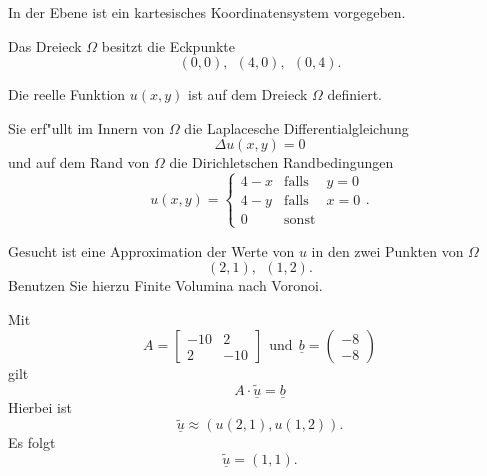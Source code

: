 In der Ebene ist ein kartesisches Koordinatensystem vorgegeben. 

\vspace{2mm}

Das Dreieck $\Omega$ besitzt die Eckpunkte
\[
(0,0), \ \ (4,0), \ \ (0,4).
\]

Die reelle Funktion $u(x,y)$ ist auf dem Dreieck $\Omega$ definiert. 

\vspace{2mm}

Sie erf"ullt im Innern von $\Omega$ die Laplacesche Differentialgleichung 
\[
\Delta u(x,y) = 0
\]
und auf dem Rand von $\Omega$ die Dirichletschen Randbedingungen 
\[
u(x,y) = \left\{ \begin{array}{ccc} 4 - x & \mbox{falls} & y = 0
\\ 4 - y & \mbox{falls} & x = 0  \\ 0  & \mbox{sonst} & \end{array} \right.       .
\]

Gesucht ist eine Approximation der Werte von $u$ in den zwei Punkten
von $\Omega$ 
\[
(2,1), \ \ (1,2).
\]
Benutzen Sie hierzu Finite Volumina nach Voronoi.

\begin{loesung}
Mit
\[
A = \left[\begin{array}{rr} -10 & 2  \\ 2 & -10  \end{array}\right] \ \ \mbox{und} \ \
  \underline{b} =  \left(\begin{array}{r} -8 \\ -8 \end{array}\right)
\]
gilt  
\[
A \cdot \underline{\tilde u} = \underline{b}
\]
Hierbei ist
\[
\underline{\tilde u} \approx (u(2,1), u(1,2)).
\]
Es folgt 
\[
\underline{\tilde u} = (1,1).
\]
\end{loesung}
